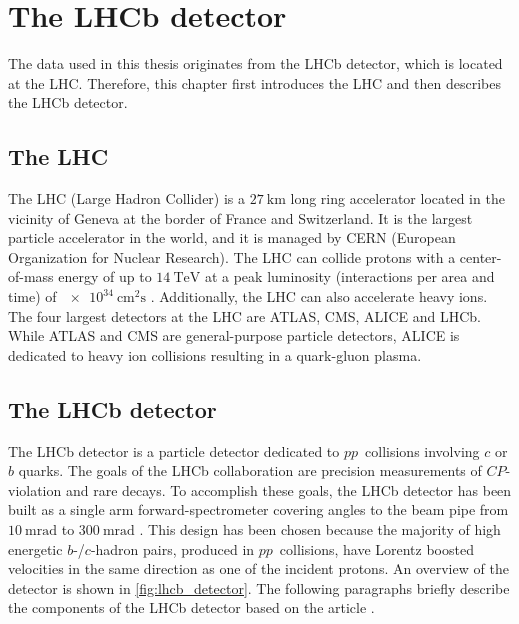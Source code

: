 \chapter{The LHCb detector}

The data used in this thesis originates from the LHCb detector, which is located at the LHC.
Therefore, this chapter first introduces the LHC and then describes the LHCb detector.

\section{The LHC}

The LHC (Large Hadron Collider) is a $\qty{27}{\km}$ long ring accelerator located in the vicinity of Geneva at the border of France and Switzerland. 
It is the largest particle accelerator in the world, and it is managed by CERN (European Organization for Nuclear Research).
The LHC can collide protons with a center-of-mass energy of up to $\qty{14}{\TeV}$ at a peak luminosity (interactions per area and time) of $\qty{e34}{\cm\squared\s}$ \cite{LHC}.
Additionally, the LHC can also accelerate heavy ions.
The four largest detectors at the LHC are ATLAS, CMS, ALICE and LHCb.
While ATLAS and CMS are general-purpose particle detectors, ALICE is dedicated to heavy ion collisions resulting in a quark-gluon plasma.

\section{The LHCb detector}

The LHCb detector is a particle detector dedicated to $pp$~collisions involving $c$ or $b$ quarks.
The goals of the LHCb collaboration are precision measurements of $C\!P$-violation and rare decays. 
To accomplish these goals, the LHCb detector has been built as a single arm forward-spectrometer covering angles to the beam pipe from $\qty{10}{\milli\radian}$ to $\qty{300}{\milli\radian}$ \cite{LHCb}. 
This design has been chosen because the majority of high energetic $b$-/$c$-hadron pairs, produced in $pp$~collisions, have Lorentz boosted velocities in the same direction as one of the incident protons.
An overview of the detector is shown in \cref{fig:lhcb_detector}.
The following paragraphs briefly describe the components of the LHCb detector based on the article \cite{LHCb}.

